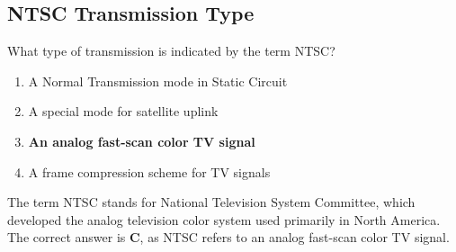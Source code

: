 \subsection{NTSC Transmission Type}
\label{T8D04}

\begin{tcolorbox}[colback=gray!10!white,colframe=black!75!black,title=T8D04]
What type of transmission is indicated by the term NTSC?
\begin{enumerate}[noitemsep]
    \item A Normal Transmission mode in Static Circuit
    \item A special mode for satellite uplink
    \item \textbf{An analog fast-scan color TV signal}
    \item A frame compression scheme for TV signals
\end{enumerate}
\end{tcolorbox}

The term NTSC stands for National Television System Committee, which developed the analog television color system used primarily in North America. The correct answer is \textbf{C}, as NTSC refers to an analog fast-scan color TV signal.